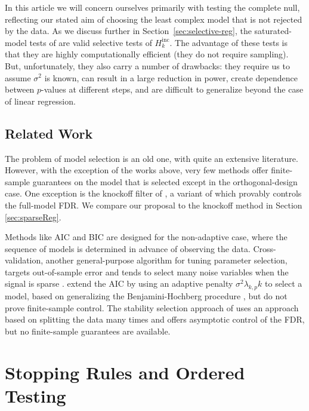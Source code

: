 \documentclass{article}
\begin{document}
In this article we will concern ourselves primarily with testing the complete null, reflecting our stated aim of choosing the least complex model that is not rejected by the data. As we discuss further in Section~\ref{sec:selective-reg}, the saturated-model tests of \citet{taylor2014exact} are valid selective tests of $H_k^{\text{inc}}$. The advantage of these tests is that they are highly computationally efficient (they do not require sampling). But, unfortunately, they also carry a number of drawbacks: they require us to assume $\sigma^2$ is known, can result in a large reduction in power, create dependence between $p$-values at different steps, and are difficult to generalize beyond the case of linear regression. 


\subsection{Related Work}

The problem of model selection is an old one, with quite an extensive literature. However, with the exception of the works above, very few methods offer finite-sample guarantees on the model that is selected except in the orthogonal-design case. One  exception is the knockoff filter of \citet{barber2014controlling}, a variant of which provably controls the full-model FDR.
We compare our proposal to the knockoff method in Section \ref{sec:sparseReg}.

Methods like AIC \citep{akaike1974new} and BIC \citep{schwarz1978estimating} are designed for the non-adaptive case, where the sequence of models is determined in advance of observing the data. Cross-validation, another general-purpose algorithm for tuning parameter selection, targets out-of-sample error and tends to select many noise variables when the signal is sparse \citep[e.g.][]{LY2015}. \citet{benjamini2009simple} extend the AIC by using an adaptive penalty $\sigma^2\lambda_{k,p} k$ to select a model, based on generalizing the Benjamini-Hochberg procedure \citep{benjamini1995controlling}, but do not prove finite-sample control. The stability selection approach of \citet{meinshausen2010stability} uses an approach based on splitting the data many times and offers asymptotic control of the FDR, but no finite-sample guarantees are available.

\section{Stopping Rules and Ordered Testing}\label{sec:ordered}
\end{document}
